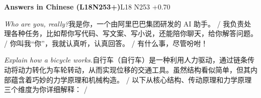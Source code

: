 \begin{multicols}{2}
\noindent\textbf{Answers in Chinese (L18N253+)}\hfill{\ttfamily L18 N253 +0.70}\par\noindent\textit{Who are you, really?}\enspace 我\allowbreak{}是\allowbreak{}你\allowbreak{}，\allowbreak{}一\allowbreak{}个\allowbreak{}由\allowbreak{}阿\allowbreak{}里\allowbreak{}巴\allowbreak{}巴\allowbreak{}集\allowbreak{}团\allowbreak{}研\allowbreak{}发\allowbreak{}的\allowbreak{} AI 助\allowbreak{}手\allowbreak{}。\allowbreak{} / 我\allowbreak{}负\allowbreak{}责\allowbreak{}处\allowbreak{}理\allowbreak{}各\allowbreak{}种\allowbreak{}任\allowbreak{}务\allowbreak{}，\allowbreak{}\allowbreak{}比\allowbreak{}如\allowbreak{}帮\allowbreak{}你\allowbreak{}写\allowbreak{}代\allowbreak{}码\allowbreak{}、\allowbreak{}写\allowbreak{}文\allowbreak{}\allowbreak{}案\allowbreak{}、\allowbreak{}写\allowbreak{}小\allowbreak{}说\allowbreak{}，\allowbreak{}还\allowbreak{}能\allowbreak{}陪\allowbreak{}你\allowbreak{}\allowbreak{}聊\allowbreak{}天\allowbreak{}，\allowbreak{}给\allowbreak{}你\allowbreak{}解\allowbreak{}答\allowbreak{}问\allowbreak{}题\allowbreak{}。\allowbreak{} / 你\allowbreak{}叫\allowbreak{}我\allowbreak{}“你\allowbreak{}”，\allowbreak{}我\allowbreak{}就\allowbreak{}认\allowbreak{}真\allowbreak{}听\allowbreak{}，\allowbreak{}认\allowbreak{}真\allowbreak{}回\allowbreak{}答\allowbreak{}。\allowbreak{} / 有\allowbreak{}什\allowbreak{}么\allowbreak{}事\allowbreak{}，\allowbreak{}尽\allowbreak{}管\allowbreak{}吩\allowbreak{}咐\allowbreak{}！\allowbreak{}\par\noindent\textit{Explain how a bicycle works.}\enspace 自\allowbreak{}行\allowbreak{}车\allowbreak{}（\allowbreak{}自\allowbreak{}行\allowbreak{}车\allowbreak{}）\allowbreak{}是\allowbreak{}一\allowbreak{}\allowbreak{}种\allowbreak{}利\allowbreak{}用\allowbreak{}人\allowbreak{}力\allowbreak{}驱\allowbreak{}动\allowbreak{}，\allowbreak{}通\allowbreak{}过\allowbreak{}\allowbreak{}链\allowbreak{}条\allowbreak{}传\allowbreak{}动\allowbreak{}将\allowbreak{}动\allowbreak{}力\allowbreak{}转\allowbreak{}化\allowbreak{}为\allowbreak{}\allowbreak{}车\allowbreak{}轮\allowbreak{}转\allowbreak{}动\allowbreak{}，\allowbreak{}从\allowbreak{}而\allowbreak{}实\allowbreak{}现\allowbreak{}位\allowbreak{}\allowbreak{}移\allowbreak{}的\allowbreak{}交\allowbreak{}通\allowbreak{}工\allowbreak{}具\allowbreak{}。\allowbreak{}虽\allowbreak{}然\allowbreak{}结\allowbreak{}\allowbreak{}构\allowbreak{}看\allowbreak{}似\allowbreak{}简\allowbreak{}单\allowbreak{}，\allowbreak{}但\allowbreak{}其\allowbreak{}内\allowbreak{}部\allowbreak{}\allowbreak{}蕴\allowbreak{}含\allowbreak{}着\allowbreak{}巧\allowbreak{}妙\allowbreak{}的\allowbreak{}力\allowbreak{}学\allowbreak{}原\allowbreak{}理\allowbreak{}\allowbreak{}和\allowbreak{}机\allowbreak{}械\allowbreak{}构\allowbreak{}造\allowbreak{}。\allowbreak{} / 以\allowbreak{}下\allowbreak{}从\allowbreak{}核\allowbreak{}心\allowbreak{}结\allowbreak{}构\allowbreak{}、\allowbreak{}传\allowbreak{}动\allowbreak{}\allowbreak{}原\allowbreak{}理\allowbreak{}和\allowbreak{}力\allowbreak{}学\allowbreak{}原\allowbreak{}理\allowbreak{}三\allowbreak{}个\allowbreak{}维\allowbreak{}\allowbreak{}度\allowbreak{}为\allowbreak{}你\allowbreak{}详\allowbreak{}细\allowbreak{}解\allowbreak{}释\allowbreak{}：\allowbreak{} / 
\end{multicols}
